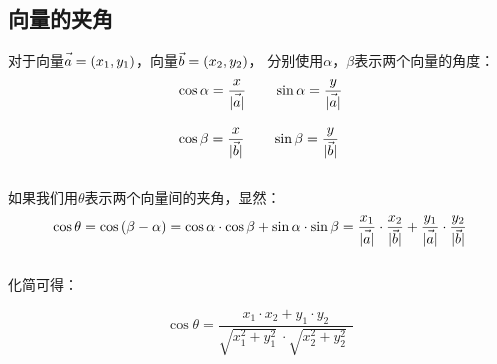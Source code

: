 \documentclass[UTF8]{ctexart}
\let\nvec\vec
\def\vec#1{\nvec{\vphantom b\smash{#1}}}
\begin{document}
\subsection{向量的夹角}
    对于向量$\vec a=(x_1,y_1)$，向量$\vec b=(x_2,y_2)$，
    分别使用$\alpha$，$\beta$表示两个向量的角度：\vspace{5pt}
    \setcounter{equation}{0}
    \begin{align}
        &\cos{\alpha}=\frac{x}{|\vec a|}\qquad
        \sin{\alpha}=\frac{y}{|\vec a|}\\[3mm]
        &\cos{\beta}=\frac{x}{|\vec b|}\qquad
        \sin{\beta}=\frac{y}{|\vec b|}
    \end{align}\\
    如果我们用$\theta$表示两个向量间的夹角，显然：\vspace{5pt}
    \begin{equation}
        \cos{\theta}
        =\cos{(\beta-\alpha)}
        =\cos{\alpha}\cdot\cos{\beta}+\sin{\alpha}\cdot\sin{\beta}
        =\frac{x_1}{|\vec a|}\cdot\frac{x_2}{|\vec b|}+\frac{y_1}{|\vec a|}\cdot\frac{y_2}{|\vec b|}
    \end{equation}\\
    化简可得：
    \begin{large}
    \begin{equation*}
        \cos{\theta}=\frac{x_1\cdot x_2+y_1\cdot y_2}{\sqrt{x_1^2+y_1^2}~\cdot\sqrt{x_2^2+y_2^2}~~}
    \end{equation*}
    \end{large}

\newpage
\end{document}
